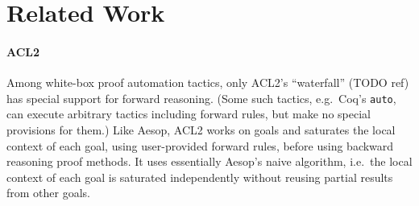 \documentclass[runningheads]{llncs}
\begin{document}
            \begin{figure}
                    \end{figure}

\section{Related Work}

\paragraph{ACL2}
Among white-box proof automation tactics, only ACL2's \enquote{waterfall} (TODO ref) has special support for forward reasoning.
(Some such tactics, e.g.\ Coq's \texttt{auto}, can execute arbitrary tactics including forward rules, but make no special provisions for them.)
Like Aesop, ACL2 works on goals and saturates the local context of each goal, using user-provided forward rules, before using backward reasoning proof methods.
It uses essentially Aesop's naive algorithm, i.e.\ the local context of each goal is saturated independently without reusing partial results from other goals.
\end{document}
